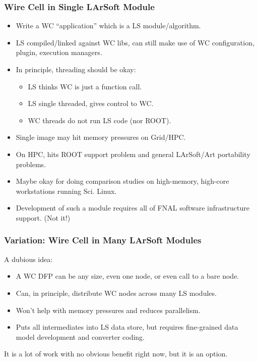 \documentclass[xcolor=dvipsnames]{beamer}
\begin{document}
\begin{frame}
  \frametitle{Wire Cell in Single LArSoft Module}
  \begin{itemize}
  \item Write a WC ``application'' which is a LS module/algorithm.
  \item LS compiled/linked against WC libs, can still make use of WC configuration, plugin, execution managers.
  \item In principle, threading should be okay:
    \begin{itemize}\footnotesize
    \item LS thinks WC is just a function call.
    \item LS single threaded, gives control to WC. 
    \item WC threads do not run LS code (nor ROOT).
    \end{itemize}
  \item Single image may hit memory pressures on Grid/HPC.
  \item On HPC, hits ROOT  support problem and general LArSoft/Art portability problems.
  \item Maybe okay for doing comparison studies on high-memory,
    high-core workstations running Sci. Linux.
  \item Development of such a module requires all of FNAL software
    infrastructure support. (Not it!)
  \end{itemize}
\end{frame}

\begin{frame}
  \frametitle{Variation: Wire Cell in Many LArSoft Modules}
  A dubious idea:
  \begin{itemize}\footnotesize
  \item A WC DFP can be any size, even one node, or even call to a bare node.
  \item Can, in principle, distribute WC nodes across many LS modules.
  \item Won't help with memory pressures and reduces parallelism.
  \item Puts all intermediates into LS data store, but requires
    fine-grained data model development and converter coding.
  \end{itemize}
  It is a lot of work with no obvious benefit right now, but it is an option.
\end{frame}
\end{document}
